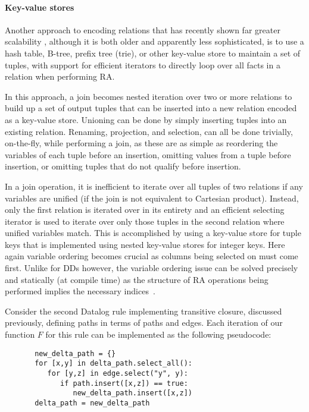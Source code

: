 \paragraph{Key-value stores} Another approach to encoding relations that has recently shown far greater scalability \cite{Scholz:2016:FLP:2892208.2892226}, although it is both older and apparently less sophisticated, is to use a hash table, B-tree, prefix tree (trie), or other key-value store to maintain a set of tuples, with support for efficient iterators to directly loop over all facts in a relation when performing RA.

In this approach, a join becomes nested iteration over two or more relations to build up a set of output tuples that can be inserted into a new relation encoded as a key-value store. Unioning can be done by simply inserting tuples into an existing relation. Renaming, projection, and selection, can all be done trivially, on-the-fly, while performing a join, as these are as simple as reordering the variables of each tuple before an insertion, omitting values from a tuple before insertion, or omitting tuples that do not qualify before insertion.

In a join operation, it is inefficient to iterate over all tuples of two relations if any variables are unified (if the join is not equivalent to Cartesian product). Instead, only the first relation is iterated over in its entirety and an efficient selecting iterator is used to iterate over only those tuples in the second relation where unified variables match. This is accomplished by using a key-value store for tuple keys that is implemented using nested key-value stores for integer keys. Here again variable ordering becomes crucial as columns being selected on must come first. Unlike for DDs however, the variable ordering issue can be solved precisely and statically (at compile time) as the structure of RA operations being performed implies the necessary indices~\cite{Subotic:2018:AIS:3282495.3302538}.

Consider the second Datalog rule implementing transitive closure, discussed previously, defining paths in terms of paths and edges. Each iteration of our function $F$ for this rule can be implemented as the following pseudocode:

\begin{verbatim}
       new_delta_path = {}
       for [x,y] in delta_path.select_all():
          for [y,z] in edge.select("y", y):
             if path.insert([x,z]) == true:
                new_delta_path.insert([x,z])
       delta_path = new_delta_path   
\end{verbatim}



